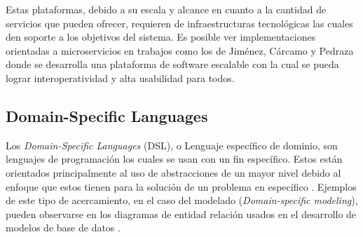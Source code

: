 \documentclass[12pt]{article}
\begin{document}
Estas plataformas, debido a su escala y alcance en cuanto a la cantidad de servicios que pueden ofrecer, requieren de
infraestructuras tecnológicas las cuales den soporte a los objetivos del sistema. Es posible ver implementaciones orientadas a microservicios en trabajos como los de Jiménez, Cárcamo y Pedraza \citeyear{henry_2020} donde se desarrolla una plataforma de software escalable con la cual se pueda lograr interoperatividad y alta usabilidad para todos.

\subsection{Domain-Specific Languages} %



Los \textit{Domain-Specific Languages} (DSL), o Lenguaje específico de dominio, son lenguajes de programación los cuales se usan con un fin específico. Estos están orientados principalmente al uso de abstracciones de un mayor nivel debido al enfoque que estos tienen para la solución de un problema en específico \cite{Kelly2008}. Ejemplos de este tipo de acercamiento, en el caso del modelado (\textit{Domain-specific modeling}), pueden observarse en los diagramas de entidad relación usados en el desarrollo de modelos de base de datos \cite{Celikovic2014ADF}.




\end{document}
